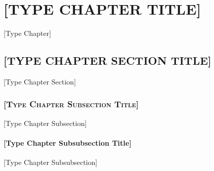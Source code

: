 \chapter{\MakeUppercase{[Type Chapter Title]}}
[Type Chapter]
\section{\MakeUppercase{[Type Chapter Section Title]}}
[Type Chapter Section]
\subsection{\textsc{[Type Chapter Subsection Title]}}
[Type Chapter Subsection]
\subsubsection{[Type Chapter Subsubsection Title]}
[Type Chapter Subsubsection]